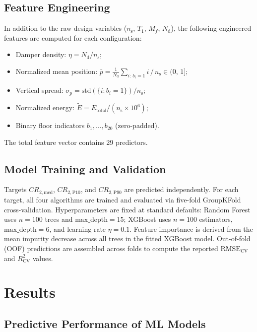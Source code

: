 \documentclass[preprint,12pt,authoryear]{elsarticle}
\newcommand{\CR}[1]{CR_{2,\text{#1}}}          %
\newcommand{\RMSE}{\mathrm{RMSE_{CV}}}
\newcommand{\Rsq}{R^{2}_{\mathrm{CV}}}
\newcommand{\nd}{N_{\mathrm{d}}}               %
\newcommand{\np}{n_{\mathrm{s}}}               %
\newcommand{\etad}{\eta}                        %
\newcommand{\Mf}{M_{\!f}}                      %
\begin{document}
\subsection{Feature Engineering}
\label{sec:method:features}

In addition to the raw design variables ($\np$, $T_1$, $\Mf$, $\nd$), the
following engineered features are computed for each configuration:
\begin{itemize}
    \item Damper density: $\etad = \nd / \np$;
    \item Normalized mean position:
          $\bar{p} = \tfrac{1}{\nd}\sum_{i:\,b_i=1} i\,/\,\np \in (0,\,1]$;
    \item Vertical spread:
          $\sigma_p = \mathrm{std}\!\left(\{i : b_i=1\}\right)/\np$;
    \item Normalized energy:
          $\tilde{E} = E_{\mathrm{total}} / (\np \times 10^6)$;
    \item Binary floor indicators $b_1,\ldots,b_{20}$ (zero-padded).
\end{itemize}
The total feature vector contains 29 predictors.

\subsection{Model Training and Validation}
\label{sec:method:training}

Targets $\CR{med}$, $\CR{P10}$, and $\CR{P90}$ are predicted independently.
For each target, all four algorithms are trained and evaluated via five-fold
GroupKFold cross-validation. Hyperparameters are fixed at standard defaults:
Random Forest uses $n=100$ trees and $\text{max\_depth}=15$; XGBoost uses
$n=100$ estimators, $\text{max\_depth}=6$, and learning rate $\eta=0.1$.
Feature importance is derived from the mean impurity decrease across all
trees in the fitted XGBoost model. Out-of-fold (OOF) predictions are
assembled across folds to compute the reported $\RMSE$ and $\Rsq$ values.

\section{Results}
\label{sec:results}

\subsection{Predictive Performance of ML Models}
\label{sec:results:perf}
\end{document}
